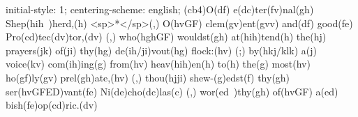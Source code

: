 initial-style: 1;
centering-scheme: english;
(cb4)O(df) e(dc)ter(fv)nal(gh) Shep(hih~)herd,(h) <sp>*</sp>(,) O(hvGF) clem(gv)ent(gvv) and(df) good(fe) Pro(cd)tec(dv)tor,(dv) (,) who(hghGF) wouldst(gh) at(hih)tend(h) the(hj) prayers(jk) of(ji) thy(hg) de(ih/ji)vout(hg) flock:(hv) (;) by(hkj/klk) a(j) voice(kv) com(ih)ing(g) from(hv) heav(hih)en(h) to(h) the(g) most(hv) ho(gf)ly(gv) prel(gh)ate,(hv) (,) thou(hjji) shew-(g)edst(f) thy(gh) ser(hvGFED)vant(fe) Ni(de)cho(dc)las(c) (,) wor(ed~)thy(gh) of(hvGF) a(ed) bish(fe)op(cd)ric.(dv)
